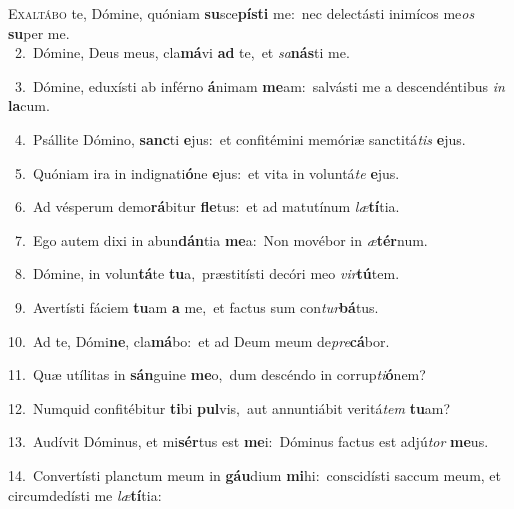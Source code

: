\lettrine{\initial\textcolor{\initialcolor}{E}}{xaltábo} te, Dómine, quóniam \textbf{su}\-sce\-\textbf{pís}\-\textbf{ti} me:~\star nec delectásti inimícos me\textit{os} \textbf{su}\-per me.\\
{\numbfont\textcolor{\numbcolor}{~2.}}~Dómine, Deus meus, cla\-\textbf{má}\-vi \textbf{ad} te,~\star et \textit{sa}\-\textbf{nás}ti me.\par
{\numbfont\textcolor{\numbcolor}{~3.}}~Dómine, eduxísti ab inférno \textbf{á}\-nimam \textbf{me}\-am:~\star salvásti me a descendéntibus \textit{in} \textbf{la}\-cum.\par
{\numbfont\textcolor{\numbcolor}{~4.}}~Psállite Dómino, \textbf{sanc}\-ti \textbf{e}\-jus:~\star et confitémini memóriæ sanctitá\textit{tis} \textbf{e}\-jus.\par
{\numbfont\textcolor{\numbcolor}{~5.}}~Quóniam ira in indignati\-\textbf{ó}\-ne \textbf{e}\-jus:~\star et vita in voluntá\textit{te} \textbf{e}\-jus.\par
{\numbfont\textcolor{\numbcolor}{~6.}}~Ad vésperum demo\-\textbf{rá}\-bitur \textbf{fle}\-tus:~\star et ad matutínum \textit{læ}\-\textbf{tí}tia.\par
{\numbfont\textcolor{\numbcolor}{~7.}}~Ego autem dixi in abun\-\textbf{dán}\-tia \textbf{me}\-a:~\star Non movébor in \textit{æ}\-\textbf{tér}num.\par
{\numbfont\textcolor{\numbcolor}{~8.}}~Dómine, in volun\-\textbf{tá}\-te \textbf{tu}\-a,~\star præstitísti decóri meo \textit{vir}\-\textbf{tú}tem.\par
{\numbfont\textcolor{\numbcolor}{~9.}}~Avertísti fáciem \textbf{tu}\-am \textbf{a} me,~\star et factus sum con\-\textit{tur}\-\textbf{bá}tus.\par
{\numbfont\textcolor{\numbcolor}{10.}}~Ad te, Dómi\-\textbf{ne}\-, cla\-\textbf{má}\-bo:~\star et ad Deum meum de\-\textit{pre}\-\textbf{cá}bor.\par
{\numbfont\textcolor{\numbcolor}{11.}}~Quæ utílitas in \textbf{sán}\-guine \textbf{me}\-o,~\star dum descéndo in corrup\-\textit{ti}\-\textbf{ó}nem?\par
{\numbfont\textcolor{\numbcolor}{12.}}~Numquid confitébitur \textbf{ti}\-bi \textbf{pul}\-vis,~\star aut annuntiábit veritá\textit{tem} \textbf{tu}\-am?\par
{\numbfont\textcolor{\numbcolor}{13.}}~Audívit Dóminus, et mi\-\textbf{sér}\-tus est \textbf{me}\-i:~\star Dóminus factus est adjú\textit{tor} \textbf{me}\-us.\par
{\numbfont\textcolor{\numbcolor}{14.}}~Convertísti planctum meum in \textbf{gáu}\-dium \textbf{mi}\-hi:~\star conscidísti saccum meum, et circumdedísti me \textit{læ}\-\textbf{tí}tia:\par
